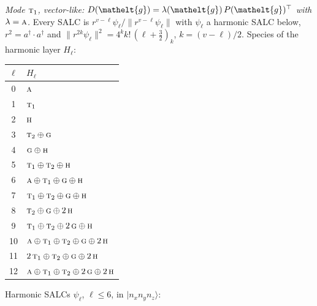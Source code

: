 \documentclass[11pt]{article}
\newcommand{\eltfont}[1]{{\let\sigma\eltsigma\mathelt{#1}}}
\newcommand{\irr}[1]{\text{\normalfont\scshape #1}}
\newcommand{\elt}[1]{\eltfont{#1}}
\newcommand{\occ}[1]{\lvert #1\rangle}
\newcommand{\gel}{\elt{g}}             %
\newcommand{\gmat}{P(\gel)^{\top}}     %
\begin{document}
\emph{Mode $\irr{t}_{1}$, vector-like: $D(\gel)=\lambda(\gel)\,\gmat$ with $\lambda=\irr{a}$.} Every SALC is $r^{v-\ell}\psi_\ell/\lVert r^{v-\ell}\psi_\ell\rVert$ with $\psi_\ell$ a harmonic SALC below, $r^2=a^\dagger\!\cdot a^\dagger$ and $\lVert r^{2k}\psi_\ell\rVert^2=4^kk!\,(\ell+\tfrac32)_k$, $k=(v-\ell)/2$. Species of the harmonic layer $H_\ell$:
\begin{longtable}{c l}\hline $\ell$ & $H_\ell$\\ \hline\endhead
0 & $\irr{a}$\\
1 & $\irr{t}_{1}$\\
2 & $\irr{h}$\\
3 & $\irr{t}_{2}\oplus \irr{g}$\\
4 & $\irr{g}\oplus \irr{h}$\\
5 & $\irr{t}_{1}\oplus \irr{t}_{2}\oplus \irr{h}$\\
6 & $\irr{a}\oplus \irr{t}_{1}\oplus \irr{g}\oplus \irr{h}$\\
7 & $\irr{t}_{1}\oplus \irr{t}_{2}\oplus \irr{g}\oplus \irr{h}$\\
8 & $\irr{t}_{2}\oplus \irr{g}\oplus 2\,\irr{h}$\\
9 & $\irr{t}_{1}\oplus \irr{t}_{2}\oplus 2\,\irr{g}\oplus \irr{h}$\\
10 & $\irr{a}\oplus \irr{t}_{1}\oplus \irr{t}_{2}\oplus \irr{g}\oplus 2\,\irr{h}$\\
11 & $2\,\irr{t}_{1}\oplus \irr{t}_{2}\oplus \irr{g}\oplus 2\,\irr{h}$\\
12 & $\irr{a}\oplus \irr{t}_{1}\oplus \irr{t}_{2}\oplus 2\,\irr{g}\oplus 2\,\irr{h}$\\
\hline\end{longtable}
Harmonic SALCs $\psi_\ell$, $\ell\le6$, in $\occ{n_xn_yn_z}$:
\end{document}
